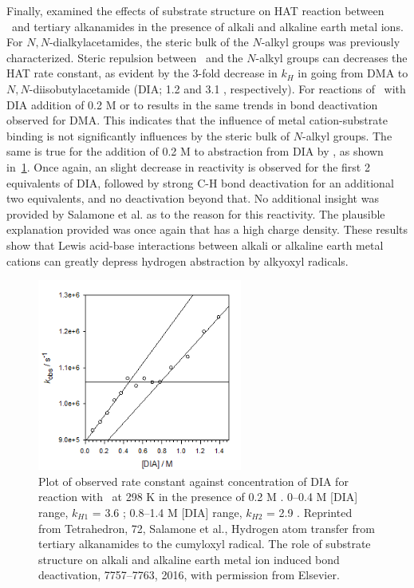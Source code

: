 Finally, \citet{Salamone2016} examined the effects of substrate structure on HAT reaction between \cumo\ and tertiary alkanamides in the presence of alkali and alkaline earth metal ions. For $N,N$-dialkylacetamides, the steric bulk of the $N$-alkyl groups was previously characterized.\cite{Salamone2014} Steric repulsion between \cumo\ and the $N$-alkyl groups can decreases the HAT rate constant, as evident by the 3-fold decrease in $k_H$ in going from DMA to $N,N$-diisobutylacetamide (DIA; 1.2 and 3.1 \Ms, respectively). For reactions of \cumo\ with DIA addition of 0.2 M  or  to results in the same trends in  bond deactivation observed for DMA. This indicates that the influence of metal cation-substrate binding is not significantly influences by the steric bulk of $N$-alkyl groups.  The same is true for the addition of 0.2 M  to abstraction from DIA by \cumo, as shown in~\ref{fig:k-dia-mg}. Once again, an slight decrease in reactivity is observed for the first 2 equivalents of DIA, followed by strong C-H bond deactivation for an additional two equivalents, and no deactivation beyond that. No additional insight was provided by Salamone et al. as to the reason for this reactivity. The plausible explanation provided was once again that  has a high charge density. These results show that Lewis acid-base interactions between alkali or alkaline earth metal cations can greatly depress hydrogen abstraction by alkyoxyl radicals.

\begin{figure}[!htbp]
  \includegraphics[width=0.6\textwidth]{figures/exptdia-mg.png}
  \caption[Plot of observed rate constant against concentration of DIA for reaction with \cumo\ at 298 K in the presence of 0.2 M .]
  {Plot of observed rate constant against concentration of DIA for reaction with \cumo\ at 298 K in the presence of 0.2 M . 0--0.4 M [DIA] range, $k_{H1}$ = 3.6 \Ms; 0.8--1.4 M [DIA] range, $k_{H2}$ = 2.9 \Ms.
  Reprinted from Tetrahedron, 72, Salamone et al., Hydrogen atom transfer from tertiary alkanamides to the cumyloxyl radical. The role of substrate structure on alkali and alkaline earth metal ion induced  bond deactivation, 7757--7763, 2016, with permission from Elsevier.}
  \label{fig:k-dia-mg}
\end{figure}

